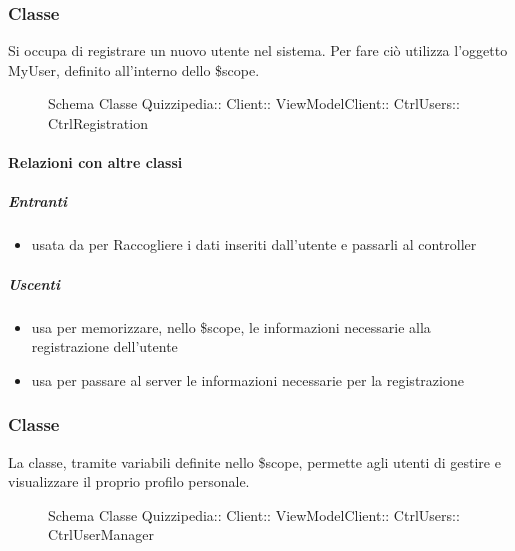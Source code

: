 \subsubsection{Classe }
Si occupa di registrare un nuovo utente nel sistema. Per fare ciò utilizza l'oggetto MyUser, definito all'interno dello \$scope.
\begin{figure}[H]
\centering
\noindent{}
\caption[Schema Classe CtrlRegistration]{Schema Classe Quizzipedia:: Client:: ViewModelClient:: CtrlUsers:: CtrlRegistration}
\end{figure}
\paragraph{Relazioni con altre classi}
\subparagraph{Entranti}
\begin{itemize}
\item usata da  per Raccogliere i dati inseriti dall'utente e passarli al controller
\end{itemize}
\subparagraph{Uscenti}
\begin{itemize}
\item usa  per memorizzare, nello \$scope, le informazioni necessarie alla registrazione dell'utente
\item usa  per passare al server le informazioni necessarie per la registrazione
\end{itemize}
\subsubsection{Classe }
La classe, tramite variabili definite nello \$scope, permette agli utenti di gestire e visualizzare il proprio profilo personale.
\begin{figure}[H]
\centering
\noindent{}
\caption[Schema Classe CtrlUserManager]{Schema Classe Quizzipedia:: Client:: ViewModelClient:: CtrlUsers:: CtrlUserManager}
\end{figure}
